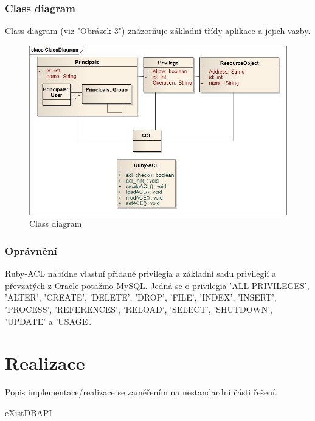 \documentclass[11pt,twoside,a4paper]{book}
\begin{document}
\subsection{Class diagram}
Class diagram (viz "Obrázek 3") znázorňuje základní třídy aplikace a jejich vazby.
\begin{figure}
\includegraphics[width=15cm]{ClassDiagram2.jpg}
\caption{Class diagram}
\label{fig:Class diagram}
\end{figure}


\newpage
\subsection{Oprávnění}
Ruby-ACL nabídne vlastní přidané privilegia a základní sadu privilegií a převzatých z Oracle potažmo MySQL. Jedná se o privilegia 'ALL PRIVILEGES', 'ALTER', 'CREATE', 'DELETE', 'DROP', 'FILE', 'INDEX', 'INSERT', 'PROCESS', 'REFERENCES', 'RELOAD', 'SELECT', 'SHUTDOWN', 'UPDATE' a 'USAGE'.

\chapter{Realizace}
Popis implementace/realizace se zaměřením na nestandardní části řešení.

eXistDBAPI
\end{document}
